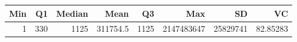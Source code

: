 
\begin{tabular}[t]{rrrrrrrr}
\toprule
Min & Q1 & Median & Mean & Q3 & Max & SD & VC\\
\midrule
1 & 330 & 1125 & 311754.5 & 1125 & 2147483647 & 25829741 & 82.85283\\
\bottomrule
\end{tabular}